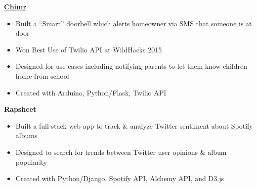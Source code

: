 \documentclass[10pt,a4paper,sans]{moderncv}        %
\begin{document}
\vspace{3pt}
\textbf{\href{http://devpost.com/software/chimr}{Chimr}}
\begin{itemize}
  \item Built a ``Smart'' doorbell which alerts homeowner via SMS that someone is at door
  \item Won Best Use of Twilio API at WildHacks 2015
  \item Designed for use cases including notifying parents to let them know children home from school
  \item Created with Arduino, Python/Flask, Twilio API
\end{itemize}

\vspace{3pt}
\textbf{Rapsheet}
\begin{itemize}
  \item Built a full-stack web app to track \& analyze Twitter sentiment about Spotify albums
  \item Designed to search for trends between Twitter user opinions \& album popularity
  \item Created with Python/Django, Spotify API, Alchemy API, and D3.js
\end{itemize}

% 


\end{document}
